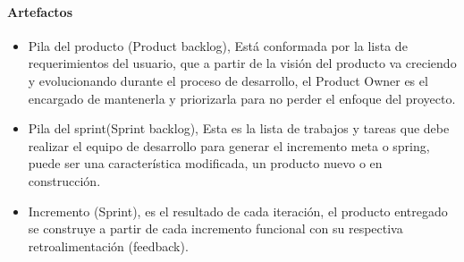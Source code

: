 \paragraph{Artefactos}

\begin{itemize}
    \item Pila del producto (Product backlog), Está conformada por la lista de requerimientos del usuario, que a partir de la visión del producto va creciendo y evolucionando durante el proceso de desarrollo, el Product Owner es el encargado de mantenerla y priorizarla para no perder el enfoque del proyecto.
    \item Pila del sprint(Sprint backlog), Esta es la lista de trabajos y tareas que debe realizar el equipo de desarrollo para generar el incremento meta o spring, puede ser una característica modificada, un producto nuevo o en construcción.
    \item Incremento (Sprint), es el resultado de cada iteración, el producto entregado se construye a partir de cada incremento funcional con su respectiva retroalimentación (feedback).
\end{itemize}
